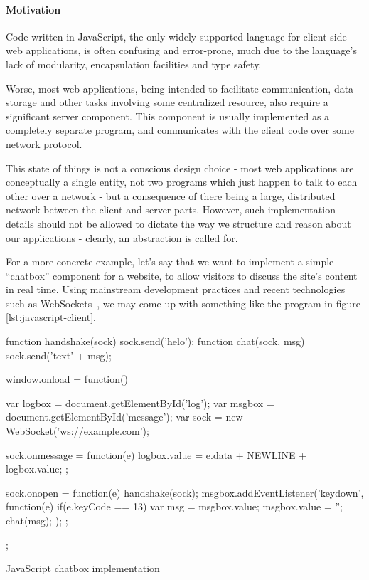 \documentclass[preprint]{sigplanconf}
\begin{document}
\paragraph{Motivation}

Code written in JavaScript, the only widely supported language for client side
web applications, is often confusing and error-prone, much due to the
language's lack of modularity, encapsulation facilities and type safety.

Worse, most web applications, being intended to facilitate communication, data
storage and other tasks involving some centralized resource, also require a
significant server component. This component is usually implemented as a
completely separate program, and communicates with the client code over some
network protocol.

This state of things is not a conscious design choice - most web applications
are conceptually a single entity, not two programs which just happen to talk
to each other over a network - but a consequence of there being a large,
distributed network between the client and server parts.
However, such implementation details should not be allowed to dictate the way
we structure and reason about our applications - clearly, an abstraction is
called for.

For a more concrete example, let's say that we want to implement a simple
``chatbox'' component for a website, to allow visitors to discuss the site's
content in real time. Using mainstream development practices and recent
technologies such as WebSockets\ \cite{websockets}, we may come up with
something like the program in figure \ref{lst:javascript-client}.

\label{sec:jsexample}
\begin{listingfloat}
\begin{code}
function handshake(sock) {sock.send('helo');}
function chat(sock, msg) {sock.send('text' + msg);}

window.onload = function() {
  var logbox = document.getElementById('log');
  var msgbox = document.getElementById('message');
  var sock = new WebSocket('ws://example.com');

  sock.onmessage = function(e) {
    logbox.value = e.data + NEWLINE + logbox.value;
  };

  sock.onopen = function(e) {
    handshake(sock);
    msgbox.addEventListener('keydown', function(e) {
      if(e.keyCode == 13) {
        var msg = msgbox.value;
        msgbox.value = '';
        chat(msg);
      }
    });
  };
};
\end{code}
\caption{JavaScript chatbox implementation}
\label{lst:javascript-client}
\end{listingfloat}
\end{document}

